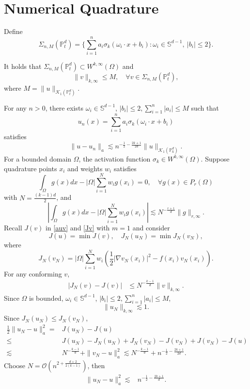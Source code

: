 \section{Numerical Quadrature}
Define
$$
\Sigma_{n, M}(\mathbb{P}_t^d)=\{ \sum_{i=1}^n a_i\sigma_k(\omega_i\cdot x + b_i):  \omega_i\in \mathbb{S}^{d-1},\ |b_i|\le 2\}.
$$
\begin{lemma}
It holds that $\Sigma_{n, M}(\mathbb{P}_t^d)\subset W^{k,\infty}(\Omega)$ and
$$
\|v\|_{k,\infty}\le M,\quad \forall v\in \Sigma_{n, M}(\mathbb{P}_t^d),
$$
where $M=\|u\|_{\mathcal{K}_1(\mathbb{P}_t^d)}$.
\end{lemma}

For any $n>0$, there exists $\displaystyle \omega_i\in \mathbb{S}^{d-1}$, $\displaystyle |b_i|\le 2, \sum_{i=1}^n |a_i|\le M$ such that
$$
u_n(x)= \sum_{i=1}^n a_i\sigma_k(\omega_i\cdot x + b_i)
$$
satisfies
$$
\|u-u_n\|_a\lesssim n^{-\frac12-\frac{2k+1}{2d}}\|u\|_{\mathcal{K}_1(\mathbb{P}_k^d)}.
$$
For a bounded domain $\Omega$, 
the activation function $\sigma_k\in W^{k,\infty}(\Omega)$.
Suppose quadrature points $x_i$  and weights $w_i$ satisfies 
$$
\int_\Omega g(x)dx - |\Omega|\sum_{i=1}^{N} w_ig(x_i)=0, \quad \forall g(x)\in P_{r} (\Omega)
$$
with $N=\frac{(k-1)d}{2}$, and 
$$
\left |\int_\Omega g(x)dx - |\Omega|\sum_{i=1}^N w_ig(x_i)\right |\lesssim N^{-\frac{r+1}{d}}\|g\|_{r,\infty}.
$$ 
Recall $J(v)$ in \eqref{auv} and \eqref{Jv} with $m=1$ and consider 
$$
J(u)=\min J(v),\quad J_N(u_N)=\min J_N(v_N),
$$
where 
$$
J_N(v_N)=|\Omega |\sum_{i=1}^Nw_i \left(\frac12 |\nabla v_N(x_i)|^2 - f(x_i)v_N(x_i)\right).
$$ 
For any conforming $v$,
\begin{align}
|J_N(v) - J(v)|&\le N^{-\frac{k-1}{d}}\|v\|_{k,\infty}.
\end{align}
Since $\Omega$ is bounded, $\displaystyle \omega_i\in \mathbb{S}^{d-1}$, $|b_i|\le 2, \sum_{i=1}^n |a_i|\le M$, 
$$
\|u_N\|_{k,\infty}\lesssim 1.
$$
Since $J_N(u_N)\le J_N(v_N)$,
\begin{align*}
\frac12 \|u_N-u\|_a^2
=&J(u_N)- J(u) 
\\
\le &J(u_N)- J_N(u_N) + J_N(v_N) - J(v_N)+ J(v_N)- J(u)
\\
\lesssim &N^{-\frac{k-1}{d}}  + \|v_N-u\|_a^2
\lesssim N^{-\frac{k-1}{d}} +n^{-\frac12-\frac{2k+1}{2d}}.
\end{align*}
Choose 
$ N = \mathcal{O}(n^{2+\frac{d+2}{2(k-1)}})$, then
\begin{align*}
\|u_N-u\|_a^2
\lesssim & n^{-\frac12-\frac{2k+1}{d}}.
\end{align*}







